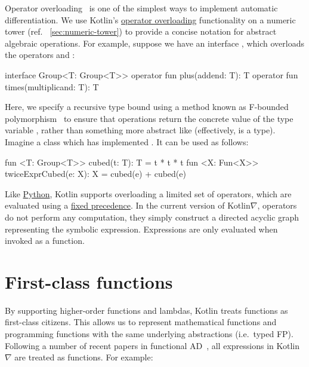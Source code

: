 \noindent Operator overloading~\citep{corliss1993operator} is one of the simplest ways to implement automatic differentiation. We use Kotlin's \href{https://kotlinlang.org/docs/reference/operator-overloading.html}{operator overloading} functionality on a numeric tower (ref. ~\autoref{sec:numeric-tower}) to provide a concise notation for abstract algebraic operations. For example, suppose we have an interface , which overloads the operators \inline{+} and \inline{*}:
%
\begin{kotlinlisting}
interface Group<T: Group<T>> {
    operator fun plus(addend: T): T
    operator fun times(multiplicand: T): T
}
\end{kotlinlisting}
%
Here, we specify a recursive type bound using a method known as F-bounded polymorphism~\citep{canning1989f} to ensure that operations return the concrete value of the type variable , rather than something more abstract like  (effectively,  is a  type). Imagine a class  which has implemented . It can be used as follows:
%
\begin{kotlinlisting}
fun <T: Group<T>> cubed(t: T): T = t * t * t
fun <X: Fun<X>> twiceExprCubed(e: X): X = cubed(e) + cubed(e)
\end{kotlinlisting}
%
Like \href{https://docs.python.org/3/reference/datamodel.html#special-method-names}{Python}, Kotlin supports overloading a limited set of operators, which are evaluated using a \href{https://kotlinlang.org/docs/reference/grammar.html#precedence}{fixed precedence}. In the current version of Kotlin$\nabla$, operators do not perform any computation, they simply construct a directed acyclic graph representing the symbolic expression. Expressions are only evaluated when invoked as a function.

\section{First-class functions}\label{sec:first-class-functions}

By supporting higher-order functions and lambdas, Kotlin treats functions as first-class citizens. This allows us to represent mathematical functions and programming functions with the same underlying abstractions (i.e.\ typed FP). Following a number of recent papers in functional AD~\citep{pearlmutter2008reverse,wang2018backpropagation}, all expressions in Kotlin$\nabla$ are treated as functions. For example:

